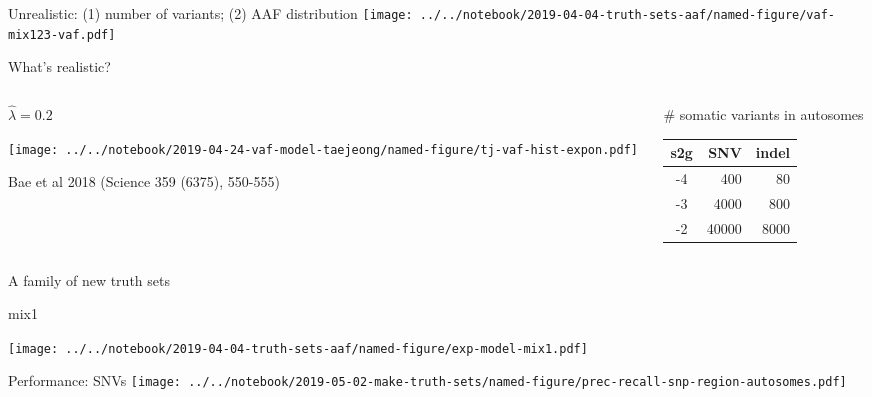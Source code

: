 \documentclass{beamer}
\begin{document}
\begin{frame}{Unrealistic: (1) number of variants; (2) AAF distribution}
\texttt{[image: ../../notebook/2019-04-04-truth-sets-aaf/named-figure/vaf-mix123-vaf.pdf]}
\end{frame}

\begin{frame}{What's realistic?}

\begin{columns}
\begin{column}{0.5\textwidth}
\begin{center}
\(\hat{\lambda} = 0.2\)
\end{center}

\texttt{[image: ../../notebook/2019-04-24-vaf-model-taejeong/named-figure/tj-vaf-hist-expon.pdf]}

\tiny Bae et al 2018 (Science 359 (6375), 550-555)
\end{column}

\begin{column}{0.5\textwidth}
\# somatic variants in autosomes
\begin{center}
\begin{tabular}{c|r|r}
s2g & SNV & indel \\
\hline
-4 & 400 & 80 \\
-3 & 4000 & 800 \\
-2 & 40000 & 8000 \\
\end{tabular}
\end{center}
\end{column}
\end{columns}
\end{frame}

\begin{frame}{A family of new truth sets}
\begin{center}
\large mix1
\end{center}

\texttt{[image: ../../notebook/2019-04-04-truth-sets-aaf/named-figure/exp-model-mix1.pdf]}
\end{frame}



\begin{frame}{Performance: SNVs}
\texttt{[image: ../../notebook/2019-05-02-make-truth-sets/named-figure/prec-recall-snp-region-autosomes.pdf]}
\end{frame}
\end{document}
